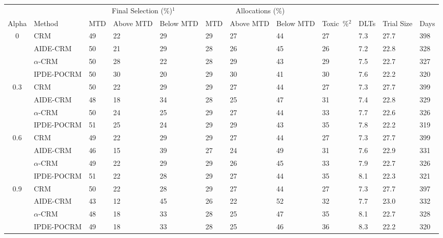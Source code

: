 \begin{tabular*}{\textwidth}{@{\extracolsep\fill}clllllllllll@{\extracolsep\fill}}
\toprule
&  & \multicolumn{3}{c}{Final Selection (\%)$^1$} & \multicolumn{3}{c}{Allocations (\%)} & &  &  &  \\
\multirow{2}{2em}{Alpha} & \multirow{2}{2em}{Method} & \multirow{2}{2em}{MTD} & \multirow{2}{2em}{Above MTD} & \multirow{2}{2em}{Below MTD} & \multirow{2}{2em}{MTD} & \multirow{2}{2em}{Above MTD} & \multirow{2}{2em}{Below MTD} & \multirow{2}{2em}{Toxic~\%$^2$} & \multirow{2}{2em}{DLTs} & \multirow{2}{2em}{Trial Size} & \multirow{2}{2em}{Days}  \\ \\ 
\midrule
\multirow{4}{2em}{0} & CRM & 49 & 22 & 29 & 29 & 27 & 44 & 27 & 7.3 & 27.7 & 398\\
 & AIDE-CRM & 50 & 21 & 29 & 28 & 26 & 45 & 26 & 7.2 & 22.8 & 328\\
 & $\alpha$-CRM & 50 & 28 & 22 & 28 & 29 & 43 & 29 & 7.5 & 22.7 & 327\\
 & IPDE-POCRM & 50 & 30 & 20 & 29 & 30 & 41 & 30 & 7.6 & 22.2 & 320\\
\midrule
\multirow{4}{2em}{0.3} & CRM & 50 & 22 & 29 & 29 & 27 & 44 & 27 & 7.3 & 27.7 & 399\\
 & AIDE-CRM & 48 & 18 & 34 & 28 & 25 & 47 & 31 & 7.4 & 22.8 & 329\\
 & $\alpha$-CRM & 50 & 24 & 25 & 29 & 27 & 44 & 33 & 7.7 & 22.6 & 326\\
 & IPDE-POCRM & 51 & 25 & 24 & 29 & 29 & 43 & 35 & 7.8 & 22.2 & 319\\
\midrule
\multirow{4}{2em}{0.6} & CRM & 49 & 22 & 29 & 29 & 27 & 44 & 27 & 7.3 & 27.7 & 399\\
 & AIDE-CRM & 46 & 15 & 39 & 27 & 24 & 49 & 31 & 7.6 & 22.9 & 331\\
 & $\alpha$-CRM & 49 & 22 & 29 & 29 & 26 & 45 & 33 & 7.9 & 22.7 & 326\\
 & IPDE-POCRM & 51 & 22 & 28 & 29 & 27 & 44 & 35 & 8.1 & 22.3 & 321\\
\midrule
\multirow{4}{2em}{0.9} & CRM & 50 & 22 & 28 & 29 & 27 & 44 & 27 & 7.3 & 27.7 & 397\\
 & AIDE-CRM & 43 & 12 & 45 & 26 & 22 & 52 & 32 & 7.7 & 23.0 & 332\\
 & $\alpha$-CRM & 48 & 18 & 33 & 28 & 25 & 47 & 35 & 8.1 & 22.7 & 328\\
 & IPDE-POCRM & 49 & 18 & 33 & 28 & 25 & 46 & 36 & 8.3 & 22.2 & 320\\
\bottomrule
\end{tabular*}

